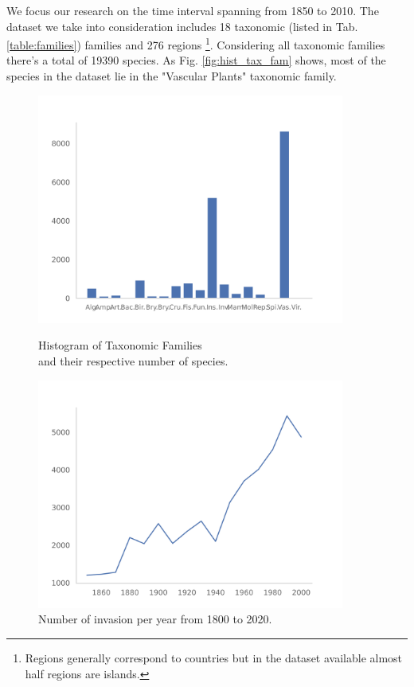 \documentclass[mscthesis]{usiinfthesis}
\begin{document}
We focus our research on the time interval spanning from 1850 to 2010. The dataset we take into consideration includes 18 taxonomic (listed in Tab. \ref{table:families}) families and 276 regions \footnote{Regions generally correspond to countries but in the dataset available almost half regions are islands.}. Considering all taxonomic families there's a total of 19390 species. As Fig. \ref{fig:hist_tax_fam} shows, most of the species in the dataset lie in the "Vascular Plants" taxonomic family.

\begin{figure}[H]
\centering
\begin{minipage}{.55\textwidth}
    \centering
    \includegraphics[width=0.9\textwidth]{histogram_taxfam}
    \caption{Histogram of Taxonomic Families \\ and their respective number of species.}
    \label{fig:hist_tax_fam}
\end{minipage}%
\begin{minipage}{.55\textwidth}
    \centering
    \includegraphics[width=0.9\textwidth]{invasion_per_year.png}
    \caption{Number of invasion per year from 1800 to 2020.}
    \label{fig:invasion_per_year}
\end{minipage}
\end{figure}
\end{document}
